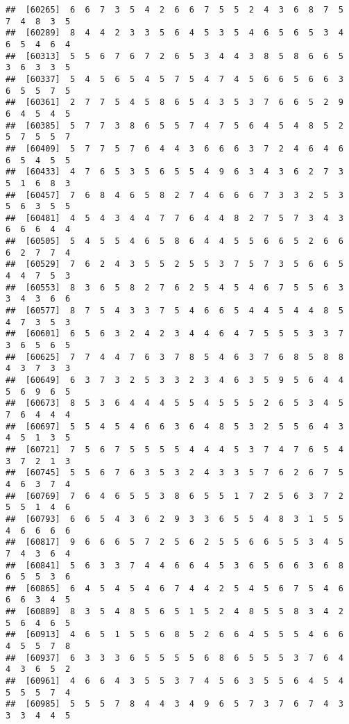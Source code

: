 \documentclass[
]{book}
\begin{document}
\begin{verbatim}
##  [60265]  6  6  7  3  5  4  2  6  6  7  5  5  2  4  3  6  8  7  5  7  4  8  3  5
##  [60289]  8  4  4  2  3  3  5  6  4  5  3  5  4  6  5  6  5  3  4  6  5  4  6  4
##  [60313]  5  5  6  7  6  7  2  6  5  3  4  4  3  8  5  8  6  6  5  3  6  3  3  5
##  [60337]  5  4  5  6  5  4  5  7  5  4  7  4  5  6  6  5  6  6  3  6  5  5  7  5
##  [60361]  2  7  7  5  4  5  8  6  5  4  3  5  3  7  6  6  5  2  9  6  4  5  4  5
##  [60385]  5  7  7  3  8  6  5  5  7  4  7  5  6  4  5  4  8  5  2  5  7  5  5  7
##  [60409]  5  7  7  5  7  6  4  4  3  6  6  6  3  7  2  4  6  4  6  6  5  4  5  5
##  [60433]  4  7  6  5  3  5  6  5  5  4  9  6  3  4  3  6  2  7  3  5  1  6  8  3
##  [60457]  7  6  8  4  6  5  8  2  7  4  6  6  6  7  3  3  2  5  3  5  6  3  5  5
##  [60481]  4  5  4  3  4  4  7  7  6  4  4  8  2  7  5  7  3  4  3  6  6  6  4  4
##  [60505]  5  4  5  5  4  6  5  8  6  4  4  5  5  6  6  5  2  6  6  6  2  7  7  4
##  [60529]  7  6  2  4  3  5  5  2  5  5  3  7  5  7  3  5  6  6  5  4  4  7  5  3
##  [60553]  8  3  6  5  8  2  7  6  2  5  4  5  4  6  7  5  5  6  3  3  4  3  6  6
##  [60577]  8  7  5  4  3  3  7  5  4  6  6  5  4  4  5  4  4  8  5  4  7  3  5  3
##  [60601]  6  5  6  3  2  4  2  3  4  4  6  4  7  5  5  5  3  3  7  3  6  5  6  5
##  [60625]  7  7  4  4  7  6  3  7  8  5  4  6  3  7  6  8  5  8  8  4  3  7  3  3
##  [60649]  6  3  7  3  2  5  3  3  2  3  4  6  3  5  9  5  6  4  4  5  6  9  6  5
##  [60673]  8  5  3  6  4  4  4  5  5  4  5  5  5  2  6  5  3  4  5  7  6  4  4  4
##  [60697]  5  5  4  5  4  6  6  3  6  4  8  5  3  2  5  5  6  4  3  4  5  1  3  5
##  [60721]  7  5  6  7  5  5  5  5  4  4  4  5  3  7  4  7  6  5  4  3  7  2  1  3
##  [60745]  5  5  6  7  6  3  5  3  2  4  3  3  5  7  6  2  6  7  5  4  6  3  7  4
##  [60769]  7  6  4  6  5  5  3  8  6  5  5  1  7  2  5  6  3  7  2  5  5  1  4  6
##  [60793]  6  6  5  4  3  6  2  9  3  3  6  5  5  4  8  3  1  5  5  4  6  6  6  6
##  [60817]  9  6  6  6  5  7  2  5  6  2  5  5  6  6  5  5  3  4  5  7  4  3  6  4
##  [60841]  5  6  3  3  7  4  4  6  6  4  5  3  6  5  6  6  3  6  8  6  5  5  3  6
##  [60865]  6  4  5  4  5  4  6  7  4  4  2  5  4  5  6  7  5  4  6  6  6  3  4  5
##  [60889]  8  3  5  4  8  5  6  5  1  5  2  4  8  5  5  8  3  4  2  5  6  4  6  5
##  [60913]  4  6  5  1  5  5  6  8  5  2  6  6  4  5  5  5  4  6  6  4  5  5  7  8
##  [60937]  6  3  3  3  6  5  5  5  5  6  8  6  5  5  5  3  7  6  4  4  3  6  5  2
##  [60961]  4  6  6  4  3  5  5  3  7  4  5  6  3  5  5  6  4  5  4  5  5  5  7  4
##  [60985]  5  5  5  7  8  4  4  3  4  9  6  5  7  3  7  6  7  4  3  3  3  4  4  5

\end{verbatim}
\end{document}

